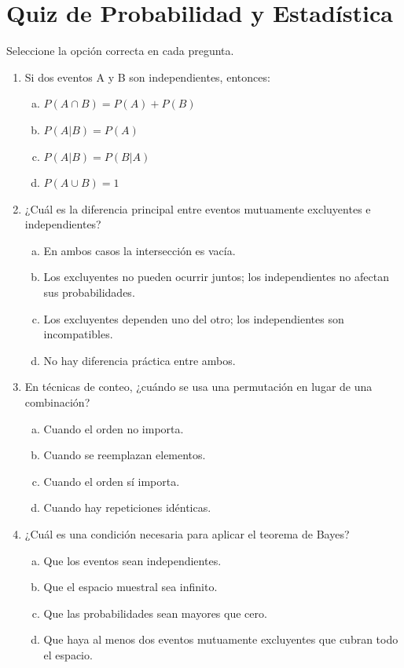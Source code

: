 \documentclass[a4paper]{article}
\begin{document}
\section{Quiz de Probabilidad y Estadística}

Seleccione la opción correcta en cada pregunta.

\begin{enumerate}

\item Si dos eventos A y B son independientes, entonces:
\begin{enumerate}[a)]
    \item $P(A \cap B) = P(A) + P(B)$
    \item $P(A|B) = P(A)$
    \item $P(A|B) = P(B|A)$
    \item $P(A \cup B) = 1$
\end{enumerate}

\item ¿Cuál es la diferencia principal entre eventos mutuamente excluyentes e independientes?
\begin{enumerate}[a)]
    \item En ambos casos la intersección es vacía.
    \item Los excluyentes no pueden ocurrir juntos; los independientes no afectan sus probabilidades.
    \item Los excluyentes dependen uno del otro; los independientes son incompatibles.
    \item No hay diferencia práctica entre ambos.
\end{enumerate}

\item En técnicas de conteo, ¿cuándo se usa una permutación en lugar de una combinación?
\begin{enumerate}[a)]
    \item Cuando el orden no importa.
    \item Cuando se reemplazan elementos.
    \item Cuando el orden sí importa.
    \item Cuando hay repeticiones idénticas.
\end{enumerate}

\item ¿Cuál es una condición necesaria para aplicar el teorema de Bayes?
\begin{enumerate}[a)]
    \item Que los eventos sean independientes.
    \item Que el espacio muestral sea infinito.
    \item Que las probabilidades sean mayores que cero.
    \item Que haya al menos dos eventos mutuamente excluyentes que cubran todo el espacio.
\end{enumerate}


\end{enumerate}
\end{document}
